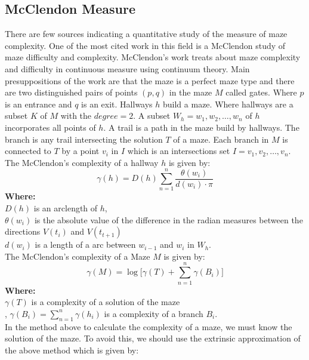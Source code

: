 \subsection{McClendon Measure}
There are few sources indicating a quantitative study of the measure of maze complexity. One of the most cited work in this field is a McClendon study of maze difficulty and complexity. 
McClendon’s work treats about maze complexity and difficulty in continuous measure using continuum theory. Main presuppositions of the work are that the maze is a perfect maze type and there are two distinguished pairs of points $(p,q)$ in the maze $M$ called gates. Where $p$ is an entrance and $q$ is an exit.  Hallways  $h$ build a maze. 
Where hallways are a subset $K$ of $M$ with the $degree = 2$. A subset $W_h = {w_1,w_2,\ldots, w_n}$ of $h$ incorporates all points of $h$. 
A trail is a path in the maze build by hallways. The branch is any trail intersecting the solution $T$ of a maze. Each branch in $M$ is connected to $T$ by a point $v_i$ in $I$ which is an intersections set $I = {v_1,v_2,\dots, v_n}$. The McClendon’s complexity of a hallway $h$ is given by:\\
\begin{equation}
\gamma(h) = D(h)\sum_{n = 1}^{n} \frac{\theta(w_i)}{d(w_i)\cdot \pi}
\end{equation}
\textbf{Where:}\\
 $D(h)$ is an arclength of $h$,\\ 
$\theta(w_i)$ is the absolute value of the difference in the radian measures between the directions $V(t_i)$ and $V(t_{t+1})$\\ 
$d(w_i)$ is a length of a arc between $w_{i-1}$ and $w_i$ in $W_h$.\\ 
\newline
The McClendon’s complexity of a Maze $M$ is given by:\\
\begin{equation}
\gamma(M)=\log\bigl[\gamma(T) + \sum_{n = 1}^{n} \gamma(B_i) \bigr]
\end{equation}
\textbf{Where:}\\
$\gamma(T)$ is a complexity of a solution of the maze\\,
$\gamma(B_i) = \sum_{n = 1}^{n} \gamma(h_i)$ is a complexity of a branch $B_i$.\\
\newline 
In the method above to calculate the complexity of a maze, we must know the solution of the maze. To avoid this, we should use the extrinsic approximation of the above method which is given by:\\
